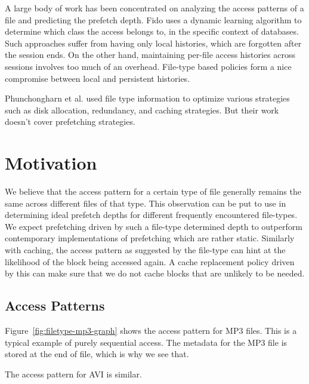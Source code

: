 \documentclass[twocolumn,10pt]{article}
\begin{document}
A large body of work has been concentrated on analyzing the access 
patterns of a file and predicting the prefetch depth. Fido \cite{13}
uses a dynamic learning algorithm to determine which class the
access belongs to, in the specific context of databases. Such 
approaches suffer from having only local histories, which are
forgotten after the session ends. On the other hand, maintaining
per-file access histories across sessions involves too much of an
overhead. File-type based policies form a nice compromise between
local and persistent histories.

Phunchongharn et al. \cite{9} used file type information to optimize
various strategies such as disk allocation, redundancy, and caching
strategies. But their work doesn't cover prefetching strategies.

\section{Motivation}

We believe that the access pattern for a certain type of file generally remains the same 
across different files of that type. This observation can be put to use in determining ideal 
prefetch depths for different frequently encountered file-types. We expect prefetching
driven by such a file-type determined depth to outperform contemporary implementations
of prefetching which are rather static. Similarly with caching, the access pattern as suggested
by the file-type can hint at the likelihood of the block being accessed again. A cache
replacement policy driven by this can make sure that we do not cache blocks that are 
unlikely to be needed.

\subsection{Access Patterns}

Figure~\ref{fig:filetype-mp3-graph} shows the access pattern for MP3 files. This is a typical example of purely
sequential access. The metadata for the MP3 file is stored at the end of file, which
is why we see that. 

The access pattern for AVI is similar.
\end{document}
